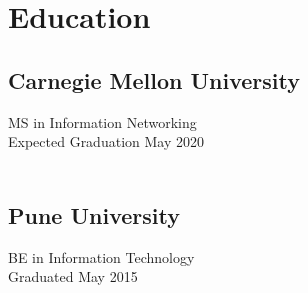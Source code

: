 \documentclass[letterpaper]{deedy-resume} %
\begin{document}
\lastupdated %
\begin{minipage}[t]{0.33\textwidth} %
\section{Education}

\subsection[Carnegie Mellon University]{Carnegie Mellon \newline University}
MS in Information Networking \\
Expected Graduation May 2020 \\
\  \\ %

\subsection{Pune University}
BE in Information Technology \\
Graduated May 2015 \\
\sectionspace %

\end{minipage}
\end{document}
